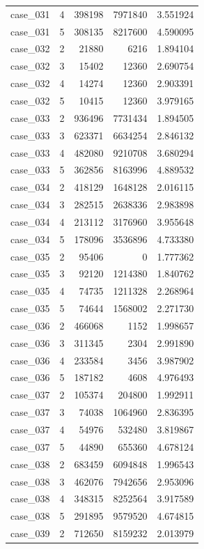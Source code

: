 \begin{longtable}{lrrrr}
case\_031 & 4 & 398198 & 7971840 & 3.551924 \\
case\_031 & 5 & 308135 & 8217600 & 4.590095 \\
case\_032 & 2 & 21880 & 6216 & 1.894104 \\
case\_032 & 3 & 15402 & 12360 & 2.690754 \\
case\_032 & 4 & 14274 & 12360 & 2.903391 \\
case\_032 & 5 & 10415 & 12360 & 3.979165 \\
case\_033 & 2 & 936496 & 7731434 & 1.894505 \\
case\_033 & 3 & 623371 & 6634254 & 2.846132 \\
case\_033 & 4 & 482080 & 9210708 & 3.680294 \\
case\_033 & 5 & 362856 & 8163996 & 4.889532 \\
case\_034 & 2 & 418129 & 1648128 & 2.016115 \\
case\_034 & 3 & 282515 & 2638336 & 2.983898 \\
case\_034 & 4 & 213112 & 3176960 & 3.955648 \\
case\_034 & 5 & 178096 & 3536896 & 4.733380 \\
case\_035 & 2 & 95406 & 0 & 1.777362 \\
case\_035 & 3 & 92120 & 1214380 & 1.840762 \\
case\_035 & 4 & 74735 & 1211328 & 2.268964 \\
case\_035 & 5 & 74644 & 1568002 & 2.271730 \\
case\_036 & 2 & 466068 & 1152 & 1.998657 \\
case\_036 & 3 & 311345 & 2304 & 2.991890 \\
case\_036 & 4 & 233584 & 3456 & 3.987902 \\
case\_036 & 5 & 187182 & 4608 & 4.976493 \\
case\_037 & 2 & 105374 & 204800 & 1.992911 \\
case\_037 & 3 & 74038 & 1064960 & 2.836395 \\
case\_037 & 4 & 54976 & 532480 & 3.819867 \\
case\_037 & 5 & 44890 & 655360 & 4.678124 \\
case\_038 & 2 & 683459 & 6094848 & 1.996543 \\
case\_038 & 3 & 462076 & 7942656 & 2.953096 \\
case\_038 & 4 & 348315 & 8252564 & 3.917589 \\
case\_038 & 5 & 291895 & 9579520 & 4.674815 \\
case\_039 & 2 & 712650 & 8159232 & 2.013979 \\

\end{longtable}
